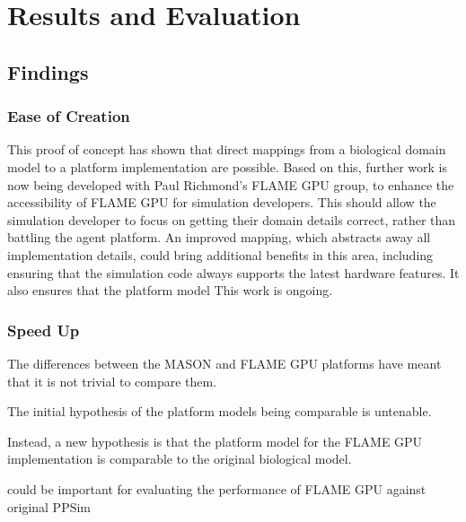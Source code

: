 \documentclass{UoYCSproject}
\begin{document}
\chapter{Results and Evaluation}
\label{results}


\section{Findings}
\subsection{Ease of Creation}
This proof of concept has shown that direct mappings from a biological domain model to a platform implementation are possible.
Based on this, further work is now being developed with Paul Richmond's \gls{FLAME GPU} group, to enhance the accessibility of \gls{FLAME GPU} for simulation developers.
This should allow the simulation developer to focus on getting their domain details correct, rather than battling the agent platform.
An improved mapping, which abstracts away all implementation details, could bring additional benefits in this area, including ensuring that the simulation code always supports the latest hardware features.
It also ensures that the platform model 
This work is ongoing.

\subsection{Speed Up}
The differences between the \gls{MASON} and \gls{FLAME GPU} platforms have meant that it is not trivial to compare them.


The initial hypothesis of the platform models being comparable is untenable.

Instead, a new hypothesis is that the platform model for the \gls{FLAME GPU} implementation is comparable to the original biological model.

\cite{statistical_tests} could be important for evaluating the performance of \gls{FLAME GPU} against original PPSim

\end{document}
